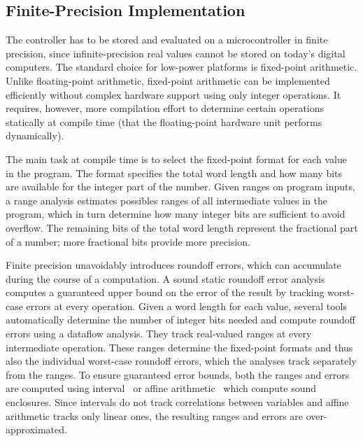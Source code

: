 \subsection{Finite-Precision Implementation}

The controller has to be stored and evaluated on a microcontroller in
finite precision, since infinite-precision real values cannot be stored on
today's digital computers.
The standard choice for low-power platforms is fixed-point arithmetic. Unlike
floating-point arithmetic, fixed-point arithmetic can be implemented efficiently
without complex hardware support using only integer operations. It requires,
however, more compilation effort to determine certain operations statically at
compile time (that the floating-point hardware unit performs dynamically).
 
The main task at compile time is to select the fixed-point format for each value
in the program. The format specifies the total word length and how many bits are
available for the integer part of the number. Given ranges on program inputs, a
range analysis estimates possibles ranges of all intermediate values in the
program, which in turn determine how many integer bits are sufficient to
avoid overflow. The remaining bits of the total word length represent the
fractional part of a number; more fractional bits provide more precision. 

Finite precision unavoidably introduces roundoff errors, which can accumulate
during the course of a computation.
A sound static roundoff error analysis computes a guaranteed upper bound on the
error of the result by tracking worst-case errors at every operation. Given a
word length for each value, several tools~\cite{} automatically determine the number of
integer bits needed and compute roundoff errors using a dataflow analysis.
They track real-valued ranges at every intermediate operation. These ranges
determine the fixed-point formats and thus also the individual worst-case roundoff errors,
which the analyses track separately from the ranges. To ensure guaranteed
error bounds, both the ranges and errors are computed using interval~\cite{} or
affine arithmetic~\cite{} which compute sound enclosures. Since intervals do not
track correlations between variables and affine arithmetic tracks only linear
ones, the resulting ranges and errors are over-approximated.

